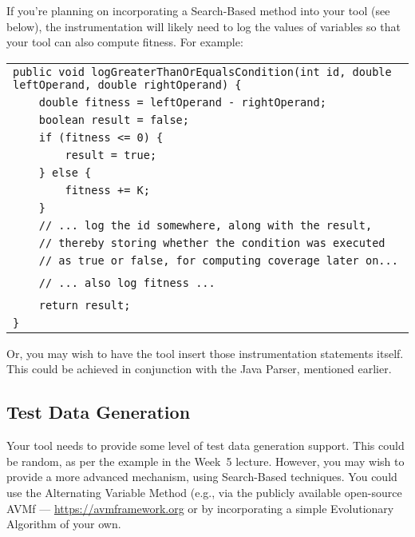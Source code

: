 If you're planning on incorporating a Search-Based method into your tool (see
below), the instrumentation will likely need to log the values of variables so
that your tool can also compute fitness. For example:

\begin{center} 
    \scriptsize
    \begin{tabular}{l}
        \toprule
        \verb$public void logGreaterThanOrEqualsCondition(int id, double leftOperand, double rightOperand) {$\\
        \verb$    double fitness = leftOperand - rightOperand;$\\
        \verb$    boolean result = false;$\\
        \verb$    if (fitness <= 0) {$\\
        \verb$        result = true;$\\
        \verb$    } else {$\\
        \verb$        fitness += K;$\\
        \verb$    }$\\
        \verb$    // ... log the id somewhere, along with the result,$\\
        \verb$    // thereby storing whether the condition was executed$\\
        \verb$    // as true or false, for computing coverage later on...$\\
        \verb$$\\
        \verb$    // ... also log fitness ...$\\
        \verb$$\\
        \verb$    return result;$\\
        \verb$}$\\
        \bottomrule
    \end{tabular}
\end{center}

Or,
you may wish to have the tool insert those instrumentation statements itself.
This could be achieved in conjunction with the Java Parser, mentioned earlier.


\subsection{Test Data Generation}

Your tool needs to provide some level of test data generation support. This
could be random, as per the example in the Week~5 lecture. However, you may wish
to provide a more advanced mechanism, using Search-Based techniques. You could
use the Alternating Variable Method (e.g., via the publicly available
open-source AVMf --- \url{https://avmframework.org} or by incorporating a simple
Evolutionary Algorithm of your own.

